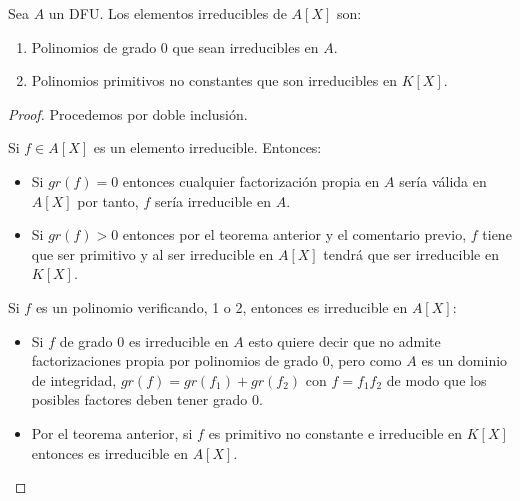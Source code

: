 \begin{corollary}
Sea $A$ un DFU. Los elementos irreducibles de $A[X]$ son:

\begin{enumerate}
\item Polinomios de grado 0 que sean irreducibles en $A$.
\item Polinomios primitivos no constantes que son irreducibles en $K[X]$.
\end{enumerate}
\end{corollary}
\begin{proof}
Procedemos por doble inclusión.

Si $f \in A[X]$ es un elemento irreducible. Entonces:

\begin{itemize}
\item Si $gr(f) = 0$ entonces cualquier factorización propia en $A$ sería válida en $A[X]$ por tanto, $f$ sería irreducible en $A$.
\item Si $gr(f) > 0$ entonces por el teorema anterior y el comentario previo, $f$ tiene que ser primitivo y al ser irreducible en $A[X]$ tendrá que ser irreducible en $K[X]$.
\end{itemize}

Si $f$ es un polinomio verificando, 1 o 2, entonces es irreducible en $A[X]$:

\begin{itemize}
\item Si $f$ de grado $0$ es irreducible en $A$ esto quiere decir que no admite factorizaciones propia por polinomios de grado $0$, pero como $A$ es un dominio de integridad, $gr(f) = gr(f_1)+gr(f_2)$ con $f = f_1f_2$ de modo que los posibles factores deben tener grado $0$. 

\item Por el teorema anterior, si $f$ es primitivo no constante e irreducible en $K[X]$ entonces es irreducible en $A[X]$. 
\end{itemize}
\end{proof}

